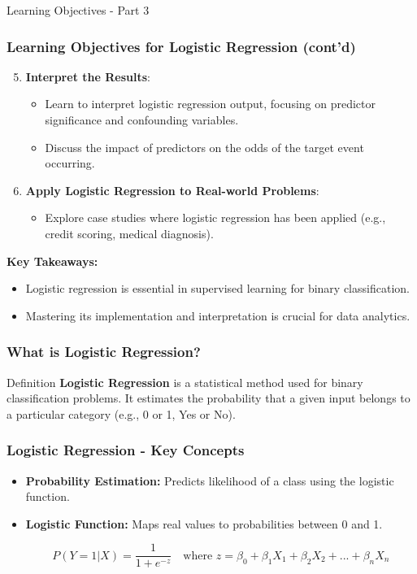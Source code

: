 \documentclass[aspectratio=169]{beamer}
\begin{document}
\begin{frame}[fragile]{Learning Objectives - Part 3}
    \frametitle{Learning Objectives for Logistic Regression (cont'd)}
    \begin{enumerate}
        \setcounter{enumi}{4}
        \item \textbf{Interpret the Results}:
        \begin{itemize}
            \item Learn to interpret logistic regression output, focusing on predictor significance and confounding variables.
            \item Discuss the impact of predictors on the odds of the target event occurring.
        \end{itemize}

        \item \textbf{Apply Logistic Regression to Real-world Problems}:
        \begin{itemize}
            \item Explore case studies where logistic regression has been applied (e.g., credit scoring, medical diagnosis).
        \end{itemize}
    \end{enumerate}
    
    \textbf{Key Takeaways:}
    \begin{itemize}
        \item Logistic regression is essential in supervised learning for binary classification.
        \item Mastering its implementation and interpretation is crucial for data analytics.
    \end{itemize}
\end{frame}

\begin{frame}[fragile]
    \frametitle{What is Logistic Regression?}
    \begin{block}{Definition}
        \textbf{Logistic Regression} is a statistical method used for binary classification problems. It estimates the probability that a given input belongs to a particular category (e.g., 0 or 1, Yes or No).
    \end{block}
\end{frame}

\begin{frame}[fragile]
    \frametitle{Logistic Regression - Key Concepts}
    \begin{itemize}
        \item \textbf{Probability Estimation:} Predicts likelihood of a class using the logistic function.
        \item \textbf{Logistic Function:} Maps real values to probabilities between 0 and 1.

        \begin{equation}
        P(Y=1 | X) = \frac{1}{1 + e^{-z}} \quad \text{where } z = \beta_0 + \beta_1 X_1 + \beta_2 X_2 + ... + \beta_n X_n
        \end{equation}
    \end{itemize}
\end{frame}
\end{document}
